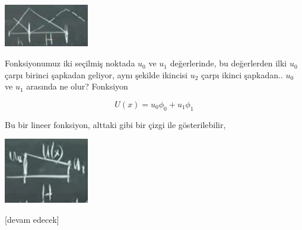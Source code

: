 \documentclass[12pt,fleqn]{article}\usepackage{../../common}
\begin{document}
\includegraphics[width=10em]{compscieng_1_20_02.png}

Fonksiyonumuz iki seçilmiş noktada $u_0$ ve $u_1$ değerlerinde, bu değerlerden
ilki $u_0$ çarpı birinci şapkadan geliyor, aynı şekilde ikincisi $u_2$ çarpı
ikinci şapkadan.. $u_0$ ve $u_1$ arasında ne olur? Fonksiyon

$$
U(x) = u_0 \phi_0 + u_1 \phi_1
$$

Bu bir lineer fonksiyon, alttaki gibi bir çizgi ile gösterilebilir,

\includegraphics[width=10em]{compscieng_1_20_03.png}














[devam edecek]
\end{document}
